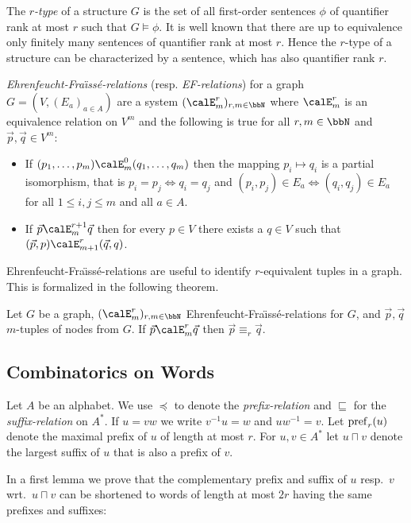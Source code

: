 The \emph{$r$-type} of a structure $G$ is the set of all first-order sentences $\phi$ of quantifier rank at most $r$ such that $G\models \phi$. It is well known that there are up to equivalence only
finitely many sentences of quantifier rank at most $r$. Hence the $r$-type of a structure can be characterized by a sentence, which has also quantifier rank $r$. 

\emph{Ehrenfeucht-Fra\"\i{}ss\'e-relations} (resp. \emph{EF-relations}) for a graph $G = (V, (E_a)_{a\in A})$ are a system $(\calE^r_m)_{r,m\in\bbN}$ where  $\calE^r_m$ is an equivalence relation on $V^m$ and
the following is true for all $r,m\in\bbN$ and $\vec{p},\vec{q} \in V^m$:
\begin{itemize}
	\item If $(p_1,\ldots,p_m) \calE^0_m (q_1,\ldots,q_m)$ then the mapping $p_i \mapsto q_i$ is a partial isomorphism, that is $p_i= p_j \Leftrightarrow q_i=q_j$ and
	$(p_i,p_j)\in E_a \Leftrightarrow (q_i,q_j) \in E_a$ for all $1\leq i,j\leq m$ and all $a\in A$.
	\item If $\vec{p} \calE^{r+1}_m \vec{q}$ then for every $p\in V$ there exists a $q\in V$ such that $(\vec{p}, p) \calE^r_{m+1} (\vec{q}, q)$.
\end{itemize}

Ehrenfeucht-Fra\"\i{}ss\'e-relations are useful to identify $r$-equivalent tuples in a graph. This is formalized in the following theorem.
\begin{theorem}
	Let $G$ be a graph, $(\calE^r_m)_{r,m\in\bbN}$ Ehrenfeucht-Fra\"\i{}ss\'e-relations for $G$, and $\vec{p}, \vec{q}$ $m$-tuples of nodes from $G$. If $\vec{p} \calE^r_m \vec{q}$ then 
	$\vec{p} \equiv_r \vec{q}$.
\end{theorem} 

\subsection{Combinatorics on Words}
Let $A$ be an alphabet. We use $\preceq$ to denote the \emph{prefix-relation} and $\sqsubseteq$ for the \emph{suffix-relation} on $A^\ast$.  If $u= vw$ we write $v^{-1}u = w$ and
$uw^{-1} = v$.
Let $\operatorname{pref}_r(u)$ denote the maximal prefix of $u$ of length at most $r$. For $u,v\in A^\ast$ let $u \sqcap v$ denote the largest suffix of $u$ that is also a prefix of $v$.

In a first lemma we prove that the complementary prefix and suffix of $u$ resp.~$v$ wrt.~$u\sqcap v$ can be shortened to words of length at most $2r$ having the same prefixes and suffixes:

